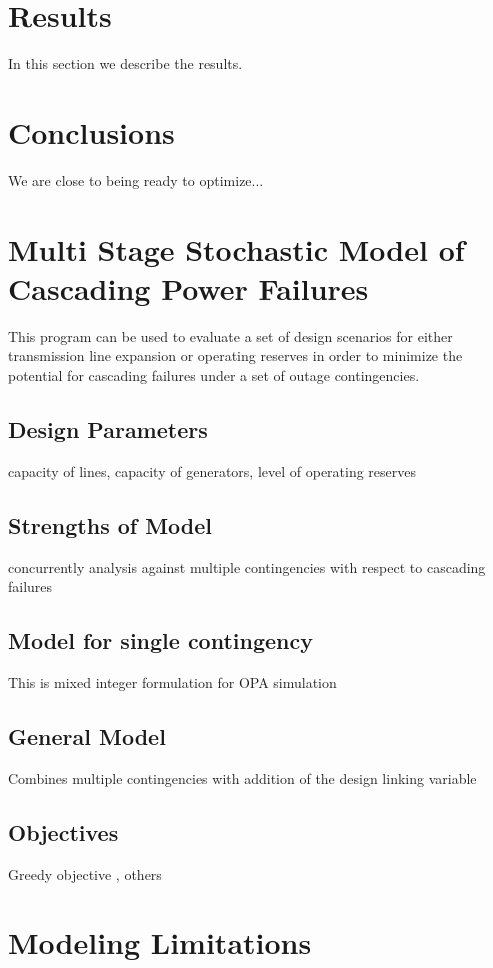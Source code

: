 \section{Results}\label{results}
In this section we describe the results.

\section{Conclusions}\label{conclusions}
We are close to being ready to optimize...



\section{Multi Stage Stochastic Model of Cascading Power Failures}
This program can be used to evaluate a set of design scenarios for either transmission line expansion or operating reserves in order to minimize the potential for cascading failures under a set of outage contingencies.
\subsection{Design Parameters}
capacity of lines, capacity of generators, level of operating reserves
\subsection{Strengths of Model}
concurrently analysis against multiple contingencies with respect to cascading failures

\subsection{Model for single contingency}
This is mixed integer formulation for OPA simulation

\subsection{General Model}
Combines multiple contingencies with addition of the design linking variable

\subsection{Objectives}
Greedy objective , others

\section{Modeling Limitations}

